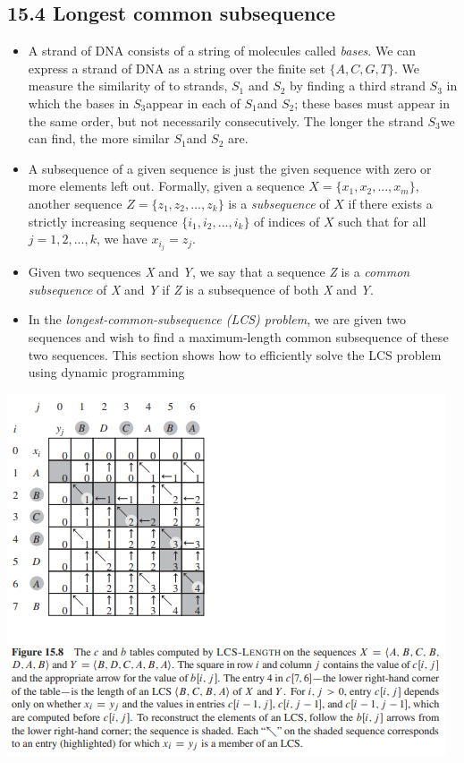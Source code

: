 \documentclass{report}
\begin{document}
\subsection*{15.4 Longest common subsequence}
\begin{itemize}
    \item A strand of DNA consists of a string of molecules called \textit{bases}. We can express a strand of DNA as a string over the finite set $\{A, C, G, T\}$. We measure the similarity of to strands, $S_1$ and $S_2$ by finding a third strand $S_3$ in which the bases in $S_3$appear in each of $S_1$and $S_2$; these bases must appear in the same order, but not necessarily consecutively. The longer the strand $S_3$we can find, the more similar $S_1$and $S_2$ are.
    \item A subsequence of a given sequence is just the given sequence with zero or more elements left out. Formally, given a sequence $X = \{x_1, x_2, ..., x_m\}$, another sequence $Z = \{z_1, z_2, ..., z_k\}$ is a \textit{subsequence} of $X$ if there exists a strictly increasing sequence $\{i_1, i_2, ..., i_k\}$ of indices of $X$ such that for all $j = 1, 2, ..., k$, we have $x_{i_j} = z_j$.
    \item Given two sequences \textit{X} and \textit{Y}, we say that a sequence \textit{Z} is a \textit{common subsequence} of \textit{X} and \textit{Y} if \textit{Z} is a subsequence of both \textit{X} and \textit{Y}.
    \item In the \textit{longest-common-subsequence (LCS) problem}, we are given two sequences and wish to find a maximum-length common subsequence of these two sequences. This section shows how to efficiently solve the LCS problem using dynamic programming
\end{itemize}

\begin{center}
    \includegraphics[height = 7 cm]{../entities/LCS_example.png}
\end{center}
\end{document}
